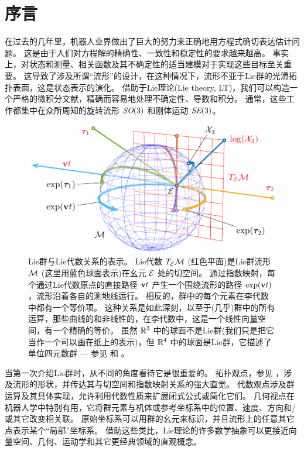
\section{序言}
\label{sec:intro}

在过去的几年里，机器人业界做出了巨大的努力来正确地用方程式确切表达估计问题。 
这是由于人们对方程解的精确性、一致性和稳定性的要求越来越高。 
事实上，对状态和测量、相关函数及其不确定性的适当建模对于实现这些目标至关重要。
这导致了涉及所谓“流形”的设计，在这种情况下，流形不亚于Lie群的光滑拓扑表面，这是状态表示的演化。
借助于Lie理论(Lie theory, LT)，我们可以构造一个严格的微积分文献，精确而容易地处理不确定性、导数和积分。
通常，这些工作都集中在众所周知的旋转流形 $\textit{SO}(3)$ 和刚体运动 $\textit{SE}(3)$。

\begin{figure}[tb]
\centering
\includegraphics{figures/exponential}
\caption{Lie群与Lie代数关系的表示。
Lie代数 $T_{\mathcal{E}}{\mathcal{M}}$ (红色平面)是Lie群流形 $\mathcal{M}$ (这里用蓝色球面表示)在幺元 $\mathcal{E}$ 处的切空间。
通过指数映射，每个通过Lie代数原点的直接路径 ${\bf v} t$ 产生一个围绕流形的路径 $\exp({\bf v} t)$ ，流形沿着各自的测地线运行。 
相反的，群中的每个元素在李代数中都有一个等价项。
这种关系是如此深刻，以至于(几乎)群中的所有运算，那些曲线的和非线性的，在李代数中，这是一个线性向量空间，有一个精确的等价。
虽然 ${\mathbb R}^3$ 中的球面不是Lie群(我们只是把它当作一个可以画在纸上的表示)，但 ${\mathbb R}^4$ 中的球面是Lie群，它描述了单位四元数群 --- 参见  和  。
}
\label{fig:exponential}
\end{figure}

当第一次介绍Lie群时，从不同的角度看待它是很重要的。 
拓扑观点，参见  ，涉及流形的形状，并传达其与切空间和指数映射关系的强大直觉。
代数观点涉及群运算及其具体实现，允许利用代数性质来扩展闭式公式或简化它们。
几何视点在机器人学中特别有用，它将群元素与机体或参考坐标系中的位置、速度、方向和/或其它改变相关联。
原始坐标系可以用群的幺元来标识，并且流形上的任意其它点表示某个“局部”坐标系。
借助这些类比，Lie理论的许多数学抽象可以更接近向量空间、几何、运动学和其它更经典领域的直观概念。


